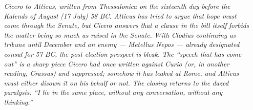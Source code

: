 
\textit{Cicero to Atticus, written from Thessalonica on the
sixteenth day before the Kalends of August (17 July) 58 BC.
Atticus has tried to argue that hope must come through the
Senate, but Cicero answers that a clause in the bill itself
forbids the matter being so much as raised in the Senate.
With Clodius continuing as tribune until December and an
enemy --- Metellus Nepos --- already designated consul for
57 BC, the post-election prospect is bleak. The
``speech that has come out'' is a sharp piece Cicero had once
written against Curio (or, in another reading, Crassus) and
suppressed; somehow it has leaked at Rome, and Atticus must
either disown it on his behalf or not. The closing
 returns to the dazed paralysis: ``I lie in the
same place, without any conversation, without any
thinking.''}
